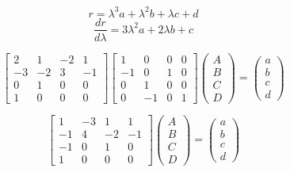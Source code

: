 \begin{equation} 
r=\lambda^3 a + \lambda^2 b + \lambda c +d
\end{equation}
\begin{equation} 
\frac{d r}{d\lambda}=3\lambda^2 a + 2\lambda b + c
\end{equation}

\begin{equation}
\left[ \begin{matrix}
2 & 1 & -2 & 1 \\
-3 & -2 & 3 & -1 \\
0 & 1 & 0 & 0 \\
1 & 0 & 0 & 0 
\end{matrix} \right]
\left[ \begin{matrix}
1 & 0 & 0 & 0 \\
-1 & 0 & 1 & 0 \\
0 & 1 & 0 & 0 \\
0 & -1 & 0 & 1 
\end{matrix} \right]
\left( \begin{matrix} A \\ B\\ C \\D\end{matrix}\right) = 
\left( \begin{matrix} a \\ b\\ c \\d\end{matrix}\right)
\end{equation}

\begin{equation}
\left[ \begin{matrix}
1 & -3 & 1 & 1 \\
-1 & 4 & -2 & -1 \\
-1 & 0 & 1 & 0 \\
1 & 0 & 0 & 0 
\end{matrix} \right]
\left( \begin{matrix} A \\ B\\ C \\D\end{matrix}\right) = 
\left( \begin{matrix} a \\ b\\ c \\d\end{matrix}\right)
\end{equation}

